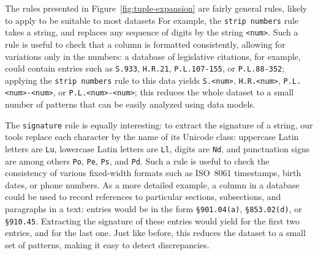 The rules presented in Figure~\ref{fig:tuple-expansion} are fairly general rules, likely to apply to be suitable to most datasets For example, the \texttt{strip numbers} rule takes a string, and replaces any sequence of digits by the string \texttt{<num>}. Such a rule is useful to check that a column is formatted consistently, allowing for variations only in the numbers: a database of legislative citations, for example, could contain entries such as \texttt{S.933}, \texttt{H.R.21}, \texttt{P.L.107-155}, or \texttt{P.L.88-352}; applying the \texttt{strip numbers} rule to this data yields \texttt{S.<num>}, \texttt{H.R.<num>}, \texttt{P.L.<num>-<num>}, or \texttt{P.L.<num>-<num>}; this reduces the whole dataset to a small number of patterns that can be easily analyzed using data models.

The \texttt{signature} rule is equally interesting: to extract the signature of a string, our tools replace each character by the name of its Unicode class: uppercase Latin letters are \texttt{Lu}, lowercase Latin letters are \texttt{Ll}, digits are \texttt{Nd}, and punctuation signs are among others \texttt{Po}, \texttt{Pe}, \texttt{Ps}, and \texttt{Pd}. Such a rule is useful to check the consistency of various fixed-width formats such as ISO~8061 timestamps, birth dates, or phone numbers. As a more detailed example, a column in a database could be used to record references to particular sections, subsections, and paragraphs in a text: entries would be in the form \texttt{\S901.04(a)}, \texttt{\S853.02(d)}, or \texttt{\S910.45}. Extracting the signature of these entries would yield  for the first two entries, and  for the last one. Just like before, this reduces the dataset to a small set of patterns, making it easy to detect discrepancies. %

